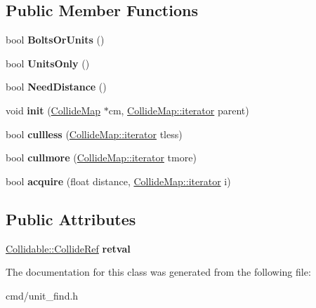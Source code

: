 \subsection*{Public Member Functions}
\begin{DoxyCompactItemize}
\item 
bool {\bfseries Bolts\+Or\+Units} ()\hypertarget{classNearestUnitLocator_a9941e3a57dcae7e5699bdcce79b16096}{}\label{classNearestUnitLocator_a9941e3a57dcae7e5699bdcce79b16096}

\item 
bool {\bfseries Units\+Only} ()\hypertarget{classNearestUnitLocator_a14816904eaf2a42608d5edd055279fa3}{}\label{classNearestUnitLocator_a14816904eaf2a42608d5edd055279fa3}

\item 
bool {\bfseries Need\+Distance} ()\hypertarget{classNearestUnitLocator_ab42f2bc472659ccf2edda0ca7ee3b1e6}{}\label{classNearestUnitLocator_ab42f2bc472659ccf2edda0ca7ee3b1e6}

\item 
void {\bfseries init} (\hyperlink{classCollideMap}{Collide\+Map} $\ast$cm, \hyperlink{classCollidable}{Collide\+Map\+::iterator} parent)\hypertarget{classNearestUnitLocator_a10f07ccc90081435e3f7753466c62137}{}\label{classNearestUnitLocator_a10f07ccc90081435e3f7753466c62137}

\item 
bool {\bfseries cullless} (\hyperlink{classCollidable}{Collide\+Map\+::iterator} tless)\hypertarget{classNearestUnitLocator_abd60f3effdb54c16013af419709ce740}{}\label{classNearestUnitLocator_abd60f3effdb54c16013af419709ce740}

\item 
bool {\bfseries cullmore} (\hyperlink{classCollidable}{Collide\+Map\+::iterator} tmore)\hypertarget{classNearestUnitLocator_ac93b98314cfc9c3cd59f3a1b0c47041a}{}\label{classNearestUnitLocator_ac93b98314cfc9c3cd59f3a1b0c47041a}

\item 
bool {\bfseries acquire} (float distance, \hyperlink{classCollidable}{Collide\+Map\+::iterator} i)\hypertarget{classNearestUnitLocator_a888ccfccf63bcfd3716848e1237393f0}{}\label{classNearestUnitLocator_a888ccfccf63bcfd3716848e1237393f0}

\end{DoxyCompactItemize}
\subsection*{Public Attributes}
\begin{DoxyCompactItemize}
\item 
\hyperlink{unionCollidable_1_1CollideRef}{Collidable\+::\+Collide\+Ref} {\bfseries retval}\hypertarget{classNearestUnitLocator_a61d6735d91210ee09a48d7558a40b8ab}{}\label{classNearestUnitLocator_a61d6735d91210ee09a48d7558a40b8ab}

\end{DoxyCompactItemize}


The documentation for this class was generated from the following file\+:\begin{DoxyCompactItemize}
\item 
cmd/unit\+\_\+find.\+h\end{DoxyCompactItemize}
